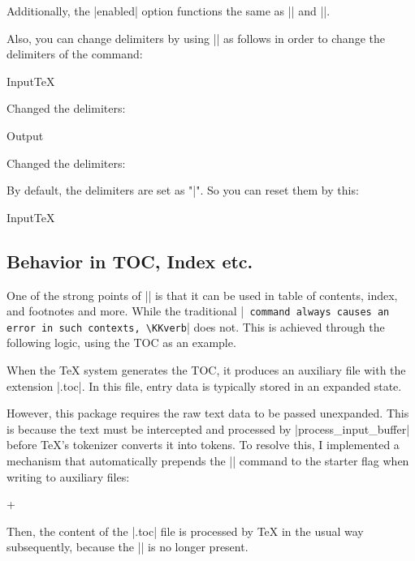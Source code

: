 \documentclass[luatex,fontsize=8pt,paper=b5,twoside]{jlreq}%
\begin{document}
Additionally, the \KKverb|enabled| option functions the same as \KKverb|\KKvScanOn| and \KKverb|\KKvScanOff|.

Also, you can change delimiters by using \KKverb|\KKvSetDelims| as follows in order to change the delimiters of the command:

\KKvScanOff
\begin{SourceCode}{Input}{TeX}
  \KKvSetDelims{[<}{>]}

  Changed the delimiters: \KKverb[<\def\foo\s>]
\end{SourceCode}

\KKvScanOn
\begin{OutPut}{Output}
\KKvSetDelims{[<}{>]}

Changed the delimiters: \KKverb[<\def\foo\s>]
\end{OutPut}

\KKvSetDelims{|}{|}

By default, the delimiters are set as "|". So you can reset them by this:

\KKvScanOff
\begin{SourceCode}{Input}{TeX}
\KKvSetDelims{|}{|}
\end{SourceCode}
\KKvScanOn

\subsection{Behavior in TOC, Index etc.}
One of the strong points of \KKverb|\KKverb| is that it can be used in table of contents, index, and footnotes and more. 
While the traditional \KKverb|\verb| command always causes an error in such contexts, \KKverb|\KKverb| does not. This is achieved through the following logic, using the TOC as an example.

When the TeX system generates the TOC, it produces an auxiliary file with the extension \KKverb|.toc|. In this file, entry data is typically stored in an expanded state. 

However, this package requires the raw text data to be passed unexpanded. This is because the text must be intercepted and processed by \KKverb|process_input_buffer| before TeX's tokenizer converts it into tokens. To resolve this, I implemented a mechanism that automatically prepends the \KKverb|\unexpanded| command to the starter flag when writing to auxiliary files: 

\KKcodeS+
\noexpand{}\noexpand\KKlvEnd*%
\KKcodeE

Then, the content of the \KKverb|.toc| file is processed by TeX in the usual way subsequently, because the \KKverb|\unexpanded| is no longer present.
\end{document}
